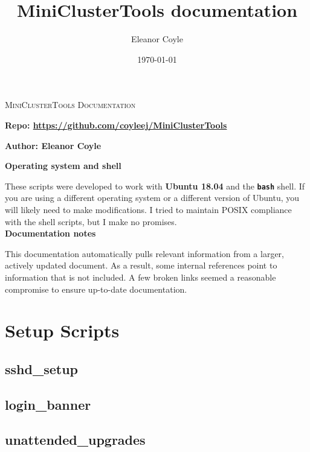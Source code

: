 \documentclass[10pt,letterpaper]{report}
\title{MiniClusterTools documentation}
\author{Eleanor Coyle}
\date{\today}
\begin{document}
\begin{titlepage}
	\centering
	\vfill
	{\huge\scshape MiniClusterTools Documentation\par}

	\vspace{3cm}
	\textbf{Repo: \href{https://github.com/coyleej/MiniClusterTools}{https://github.com/coyleej/MiniClusterTools}}

	\vspace{0.5cm}
	\textbf{Author: Eleanor Coyle}

	\vfill
	\textbf{Operating system and shell} \par
	These scripts were developed to work with \textbf{Ubuntu 18.04} and the \textbf{\texttt{bash}} shell. If you are using a different operating system or a different version of Ubuntu, you will likely need to make modifications. I tried to maintain POSIX compliance with the shell scripts, but I make no promises. \\

	\vspace{1cm}
	\textbf{Documentation notes} \par
	This documentation automatically pulls relevant information from a larger, actively updated document. 
	As a result, some internal references point to information that is not included. 
	A few broken links seemed a reasonable compromise to ensure up-to-date documentation.

\end{titlepage}

\tableofcontents

\chapter{Setup Scripts}			\label{ch:setup}

\section{sshd\_setup}			\label{sec:openssh}
	

\section{login\_banner}			\label{sec:login}
	

\section{unattended\_upgrades}		\label{sec:mandatoryautoupgrades}
	
\end{document}
